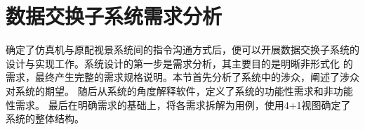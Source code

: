 



\section{数据交换子系统需求分析}
确定了仿真机与原配视景系统间的指令沟通方式后，便可以开展数据交换子系统的设计与实现工作。系统设计的第一步是需求分析，其主要目的是明晰非形式化
的需求，最终产生完整的需求规格说明。本节首先分析了系统中的涉众，阐述了涉众对系统的期望。
随后从系统的角度解释软件，定义了系统的功能性需求和非功能性需求。
最后在明确需求的基础上，将各需求拆解为用例，使用4+1视图确定了系统的整体结构。
